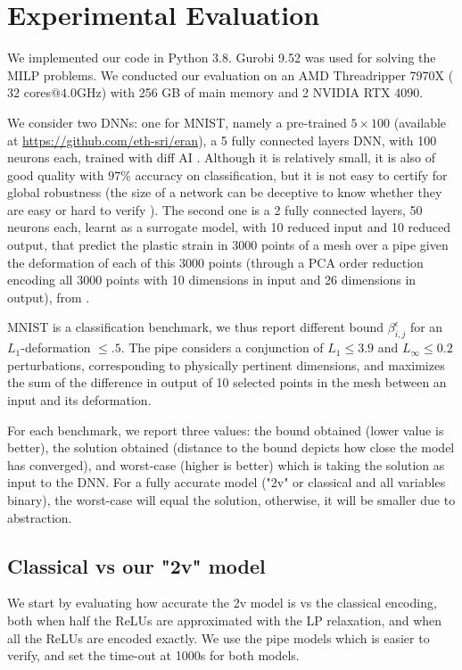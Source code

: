 	\section{Experimental Evaluation}
	
	We implemented our code in Python 3.8.
	Gurobi 9.52 was used for solving the MILP problems. We conducted our evaluation on an AMD Threadripper 7970X ($32$ cores$@4.0$GHz) with 256 GB of main memory and 2 NVIDIA RTX 4090. 
	
	We consider two DNNs: one for MNIST, namely a pre-trained $5\times 100$ (available at \url{https://github.com/eth-sri/eran}), a 5 fully connected layers DNN, with 100 neurons each,	trained with diff AI \cite{deeppoly}. 
	Although it is relatively small, it is also of good quality with $97\%$ accuracy on classification, but it is not easy to certify for global robustness (the size of a network can be deceptive to know whether they are easy or hard to verify \cite{ATVA25}).  
	The second one is a 2 fully connected layers, 50 neurons each, learnt as a surrogate model, with 10 reduced input and 10 reduced output, that predict the plastic strain in 3000 points of a mesh over a pipe given the deformation of each of this 3000 points (through a PCA order reduction encoding all 3000 points with 10 dimensions in input and 26 dimensions in output), from \cite{aiware}.
	
	MNIST is a classification benchmark, we thus report different bound $\beta^{\epsilon}_{i,j}$
	for an $L_1$-deformation $\leq .5$. The pipe considers a conjunction of $L_1 \leq 3.9$ and $L_\infty \leq 0.2$ perturbations, corresponding to physically pertinent dimensions, and 
	maximizes the sum of the difference in output of 10 selected points in the mesh between an input and its deformation.

For each benchmark, we report three values: the bound obtained (lower value is better),
the solution obtained (distance to the bound depicts how close the model has converged),
and worst-case (higher is better) which is taking the solution as input to the DNN. For a fully accurate model ("2v" or classical and all variables binary),
the worst-case will equal the solution, otherwise, it will be smaller due to abstraction.

\subsection{Classical vs our "2v" model}

We start by evaluating how accurate the 2v model is vs the classical encoding, both when half the ReLUs are approximated with the LP relaxation, and when all the ReLUs are encoded exactly. We use the pipe models which is easier to verify, and set the time-out at 1000s for both models.

